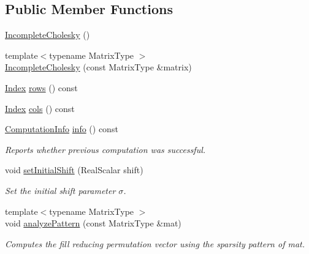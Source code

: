 \subsection*{Public Member Functions}
\begin{DoxyCompactItemize}
\item 
\hyperlink{class_eigen_1_1_incomplete_cholesky_adaaa3975b8cf53f910d6a3344af92379}{Incomplete\+Cholesky} ()
\item 
{\footnotesize template$<$typename Matrix\+Type $>$ }\\\hyperlink{class_eigen_1_1_incomplete_cholesky_a757499fc814988a5b112b1f34d0295e1}{Incomplete\+Cholesky} (const Matrix\+Type \&matrix)
\item 
\hyperlink{namespace_eigen_a62e77e0933482dafde8fe197d9a2cfde}{Index} \hyperlink{class_eigen_1_1_incomplete_cholesky_a4780a83266c871782595081021268b5a}{rows} () const
\item 
\hyperlink{namespace_eigen_a62e77e0933482dafde8fe197d9a2cfde}{Index} \hyperlink{class_eigen_1_1_incomplete_cholesky_a0d66a1c8e340617e7ff404e63186fedb}{cols} () const
\item 
\hyperlink{group__enums_ga85fad7b87587764e5cf6b513a9e0ee5e}{Computation\+Info} \hyperlink{class_eigen_1_1_incomplete_cholesky_ada0e68cb22601849464506f5986a88c1}{info} () const
\begin{DoxyCompactList}\small\item\em Reports whether previous computation was successful. \end{DoxyCompactList}\item 
\mbox{\label{class_eigen_1_1_incomplete_cholesky_a409c9586e7d29566dda2c8f5e38a1228}} 
void \hyperlink{class_eigen_1_1_incomplete_cholesky_a409c9586e7d29566dda2c8f5e38a1228}{set\+Initial\+Shift} (Real\+Scalar shift)
\begin{DoxyCompactList}\small\item\em Set the initial shift parameter $ \sigma $. \end{DoxyCompactList}\item 
\mbox{\label{class_eigen_1_1_incomplete_cholesky_a702560ecdddef77dc51d20ab22bd974e}} 
{\footnotesize template$<$typename Matrix\+Type $>$ }\\void \hyperlink{class_eigen_1_1_incomplete_cholesky_a702560ecdddef77dc51d20ab22bd974e}{analyze\+Pattern} (const Matrix\+Type \&mat)
\begin{DoxyCompactList}\small\item\em Computes the fill reducing permutation vector using the sparsity pattern of {\itshape mat}. \end{DoxyCompactList}\item 

\end{DoxyCompactItemize}
